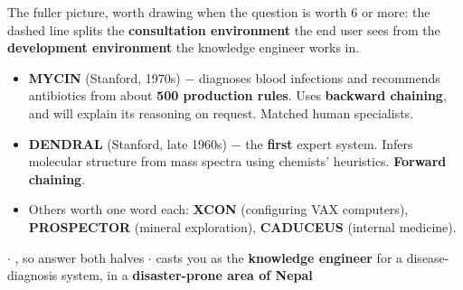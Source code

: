 {{\color{sub}\footnotesize The fuller picture, worth drawing when the question is worth 6
or more: the dashed line splits the \textbf{consultation environment} the end user sees
from the \textbf{development environment} the knowledge engineer works in.}
\begin{itemize}
  \item \textbf{MYCIN} (Stanford, 1970s) $-$ diagnoses blood infections and recommends
        antibiotics from about \textbf{500 production rules}. Uses
        \textbf{backward chaining}, and will explain its reasoning on request. Matched
        human specialists.
  \item \textbf{DENDRAL} (Stanford, late 1960s) $-$ the \textbf{first} expert system.
        Infers molecular structure from mass spectra using chemists' heuristics.
        \textbf{Forward chaining}.
  \item Others worth one word each: \textbf{XCON} (configuring VAX computers),
        \textbf{PROSPECTOR} (mineral exploration), \textbf{CADUCEUS} (internal medicine).
\end{itemize}}


{\color{sub}\footnotesize {}  \gap$\cdot$\gap
{}, so answer both halves
\gap$\cdot$\gap {} casts you as the \textbf{knowledge engineer} for a
disease-diagnosis system,  in a \textbf{disaster-prone area of Nepal}}

